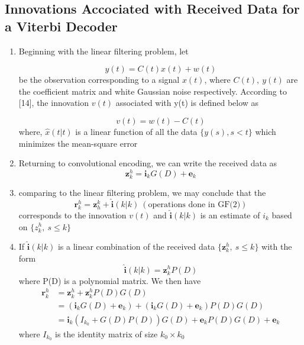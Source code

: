 \documentclass[fontsize=12pt]{article}
\theoremstyle{definition}
\begin{document}
 \subsection{Innovations Accociated with Received Data for a Viterbi Decoder}
\begin{enumerate}
\item Beginning with the linear filtering problem, let 

\begin{equation}
y(t) = C(t)x(t) +w(t)
\end{equation}
be the observation corresponding to a signal $x(t)$, where $C(t),~y(t)$ are the coefficient matrix and white Gaussian noise respectively. According to [14], the innovation $v(t)$ associated with y(t) is defined below as

\begin{equation}
v(t) =w(t) - C(t)
\end{equation}
 where, $\hat{x}(t|t)$ is a linear function of all the data $\{y(s),s<t\}$ which minimizes the mean-square error

\item Returning to convolutional encoding, we can write the received data as 
\begin{equation}
\mathbf{z}_k^h = \mathbf{i}_kG(D) + \mathbf{e}_k
\end{equation}

\item comparing to the linear filtering problem, we may conclude that the 
\begin{equation}
\mathbf{r}_k^h = \mathbf{z}_h^k + \hat{\mathbf{i}}(k|k)~(\text{operations done in GF(2)})
\end{equation}
corresponds to the innovation $v(t)$ and $\hat{\mathbf{i}}(k|k)$ is an estimate of $i_k$ based on $\{z_k^h, ~s\leq k\}$

\item If $\hat{\mathbf{i}}(k|k)$  is a linear combination of the received data $\{\mathbf{z}_k^h, ~s\leq k\}$ with the form 
\begin{equation}
\hat{\mathbf{i}}(k|k) = \mathbf{z}^h_kP(D)
\end{equation}
where P(D) is a polynomial matrix. We then have
\begin{equation}
\begin{aligned}
\mathbf{r}_{k}^{h} &=\mathbf{z}_{k}^{h}+\mathbf{z}_{k}^{h} P(D) G(D) \\
&=\left(\mathbf{i}_{k} G(D)+\mathbf{e}_{k}\right)+\left(\mathbf{i}_{k} G(D)+\mathbf{e}_{k}\right) P(D) G(D) \\
&=\mathbf{i}_{k}\left(I_{k_{0}}+G(D) P(D)\right) G(D)+\mathbf{e}_{k} P(D) G(D)+\mathbf{e}_{k}
\end{aligned}
\end{equation}
where $I_{k_{0}}$ is the identity matrix of size $k_0 \times k_0$


\end{enumerate}
\end{document}
